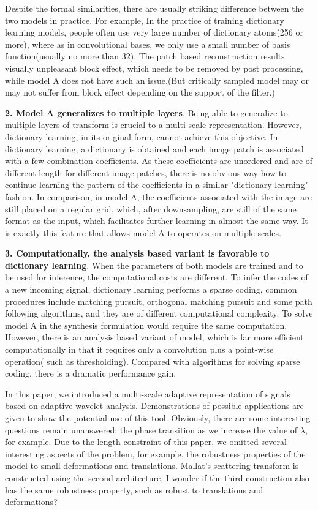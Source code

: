 \documentclass[a4paper]{article}
\begin{document}
Despite the formal similarities, there are usually striking difference between the two models in practice. For example, In the practice of training dictionary learning models, people often use very large number of dictionary atoms(256 or more), where as in convolutional bases, we only use a small number of basis function(usually no more than 32). The patch based reconstruction results visually unpleasant block effect, which needs to be removed by post processing, while model A does not have such an issue.(But critically sampled model may or may not suffer from block effect depending on the support of the filter.)

\textbf{2. Model A generalizes to multiple layers}. Being able to generalize to multiple layers of transform is crucial to a multi-scale representation. However, dictionary learning, in its original form, cannot achieve this objective. In dictionary learning, a dictionary is obtained and each image patch is associated with a few combination coefficients. As these coefficients are unordered and are of different length for different image patches, there is no obvious way how to continue learning the pattern of the coefficients in a similar "dictionary learning" fashion. In comparison, in model A, the coefficients associated with the image are still placed on a regular grid, which, after downsampling, are still of the same format as the input, which facilitates further learning in almost the same way. It is exactly this feature that allows model A to operates on multiple scales. 

\textbf{3. Computationally, the analysis based variant is favorable to dictionary learning}. When the parameters of both models are trained and to be used for inference, the computational costs are different. To infer the codes of a new incoming signal, dictionary learning performs a sparse coding, common procedures include matching pursuit, orthogonal matching pursuit and some path following algorithms, and they are of  different computational complexity. To solve model A in the synthesis formulation would require the same computation. However, there is an analysis based variant of model, which is far more efficient computationally in that it requires only a convolution plus a point-wise operation( such as thresholding). Compared with algorithms for solving sparse coding, there is a dramatic performance gain.

In this paper, we introduced a multi-scale adaptive representation of signals based on adaptive wavelet analysis. Demonstrations of possible applications are given to show the potential use of this tool. Obviously, there are some interesting questions remain unanswered: the phase transition as we increase the value of $\lambda$, for example. Due to the length constraint of this paper, we omitted several interesting aspects of the problem, for example, the robustness properties of the model to small deformations and translations.
{\color{red} Mallat's scattering transform is constructed using the second architecture, I wonder if the third construction also has the same robustness property, such as robust to translations and deformations?}
\end{document}
